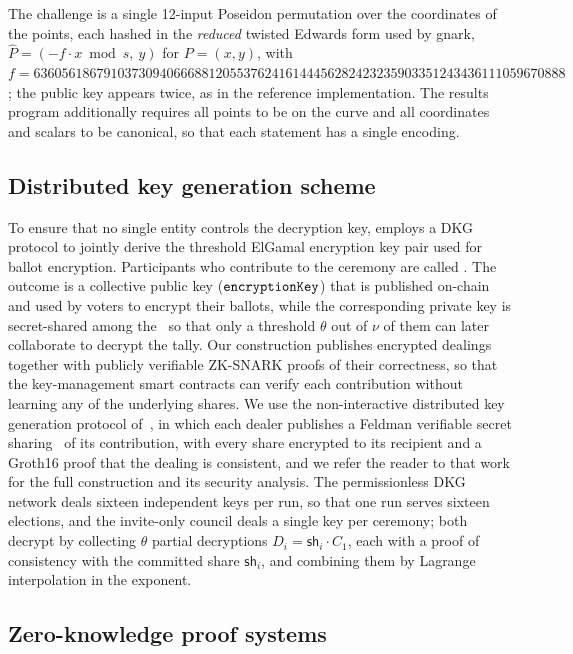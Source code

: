 The challenge is a single 12-input Poseidon permutation over the coordinates of the points, each hashed in the \emph{reduced} twisted Edwards form used by gnark, $\hat{P} = (-f \cdot x \bmod s,\ y)$ for $P = (x, y)$, with $f = 6360561867910373094066688120553762416144456282423235903351243436111059670888$; the public key appears twice, as in the reference implementation. The results program additionally requires all points to be on the curve and all coordinates and scalars to be canonical, so that each statement has a single encoding.

\subsection{Distributed key generation scheme}
\label{sec:cryptographic-primitives:dkg}

To ensure that no single entity controls the decryption key, \davinci employs a \ac{DKG} protocol to jointly derive the threshold ElGamal encryption key pair used for ballot encryption. Participants who contribute to the ceremony are called \emph{\keywardens}. The outcome is a collective public key ($\texttt{encryptionKey}$) that is published on-chain and used by voters to encrypt their ballots, while the corresponding private key is secret-shared among the \keywardens\ so that only a threshold $\theta$ out of $\nu$ of them can later collaborate to decrypt the tally. Our construction publishes encrypted dealings together with publicly verifiable \ac{ZK-SNARK} proofs of their correctness, so that the key-management smart contracts can verify each contribution without learning any of the underlying shares. We use the non-interactive distributed key generation protocol of~\cite{kampa2026dkg}, in which each dealer publishes a Feldman verifiable secret sharing~\cite{feldman1987practical} of its contribution, with every share encrypted to its recipient and a Groth16 proof that the dealing is consistent, and we refer the reader to that work for the full construction and its security analysis. The permissionless \ac{DKG} network deals sixteen independent keys per run, so that one run serves sixteen elections, and the invite-only council deals a single key per ceremony; both decrypt by collecting $\theta$ partial decryptions $D_i = \mathsf{sh}_i \cdot C_1$, each with a proof of consistency with the committed share $\mathsf{sh}_i$, and combining them by Lagrange interpolation in the exponent.

\subsection{Zero-knowledge proof systems}
\label{sec:cryptographic-primitives:zkp}

